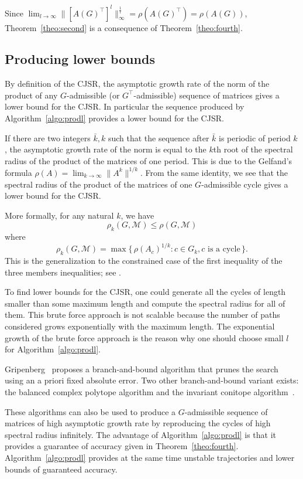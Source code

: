\documentclass{sig-alternate-05-2015}
\newcommand{\1}{\mathbf{1}}
\theoremstyle{definition}
\newcommand{\Tr}{\top}
\newcommand{\A}{\mathcal{M}}
\newcommand{\G}{G}
\newcommand{\cjsr}{\rho(\G,\A)}
\newcommand{\Sect}{Section~}
\begin{document}
Since $\lim_{l \to \infty} \|[A(\G)^\Tr ]^l\|_\infty^{\frac{1}{l}} = \rho(A(\G)^\Tr ) = \rho(A(\G))$, Theorem~\ref{theo:second} is a consequence of Theorem~\ref{theo:fourth}.


\subsection{Producing lower bounds}
\label{sec:lb}
By definition of the CJSR, the asymptotic growth rate of the norm of the product of any $\G$-admissible (or $\G^\Tr $-admissible) sequence of matrices gives a lower bound for the CJSR.
In particular the sequence produced by Algorithm~\ref{algo:prodl} provides a lower bound for the CJSR.

If there are two integers $\bar{k},k$ such that the sequence after $\bar{k}$ is periodic of period $k$,
the asymptotic growth rate of the norm is equal to the $k$th root of the spectral radius of the product of the matrices of one period.
This is due to the Gelfand's formula $\rho(A) = \lim_{k \to \infty} \|A^k\|^{1/k}$.
From the same identity,
we see that the spectral radius of the product of the matrices of one $\G$-admissible cycle gives a lower bound for the CJSR.


More formally, for any natural $k$, we have
\[ \rho_k(\G, \A) \leq \cjsr \]
where
\[ \rho_k(\G, \A) = \max \big\{\, \rho(A_c)^{1/k} : c \in \G_k, c \text{ is a cycle}\,\big\}. \]
This is the generalization to the constrained case of the first inequality of the three members inequalities; see \cite[\Sect1.2.2.6]{jungers2009joint}.

To find lower bounds for the CJSR,
one could generate all the cycles of length smaller than some maximum length
and compute the spectral radius for all of them.
This brute force approach is not scalable because the number of paths considered grows exponentially with the maximum length.
The exponential growth of the brute force approach is the reason why one should choose small $l$ for Algorithm~\ref{algo:prodl}.

Gripenberg~\cite{gripenberg1996computing} proposes a branch-and-bound algorithm that prunes the search using an a priori fixed absolute error.
Two other branch-and-bound variant exists:
the balanced complex polytope algorithm \cite{guglielmi2008algorithm}
and the invariant conitope algorithm~\cite{jungers2014lifted}.

These algorithms can also be used to produce a $\G$-admissible sequence of matrices of high asymptotic growth rate
by reproducing the cycles of high spectral radius infinitely.
The advantage of Algorithm~\ref{algo:prodl} is that it provides a guarantee of accuracy given in Theorem~\ref{theo:fourth}.
Algorithm~\ref{algo:prodl} provides at the same time unstable trajectories and lower bounds of guaranteed accuracy.
\end{document}
